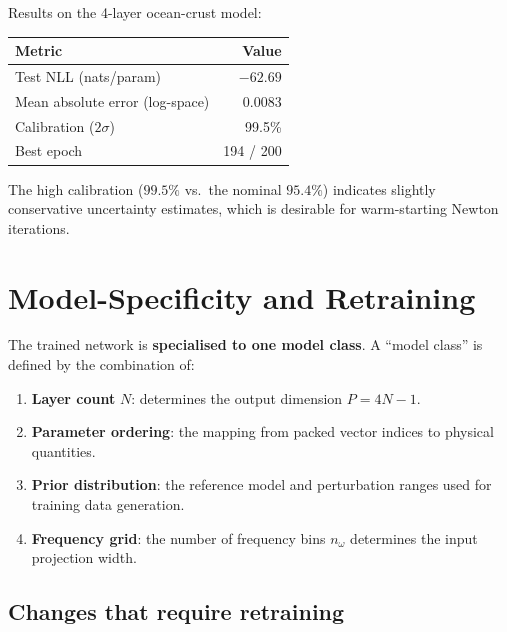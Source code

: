 \documentclass[11pt,a4paper]{article}
\theoremstyle{plain}
\theoremstyle{remark}
\begin{document}
\noindent Results on the 4-layer ocean-crust model:
\begin{center}
\renewcommand{\arraystretch}{1.3}
\begin{tabular}{lr}
  \toprule
  \textbf{Metric} & \textbf{Value} \\
  \midrule
  Test NLL (nats/param) & $-62.69$ \\
  Mean absolute error (log-space) & 0.0083 \\
  Calibration ($2\sigma$) & 99.5\% \\
  Best epoch & 194 / 200 \\
  \bottomrule
\end{tabular}
\end{center}

\noindent The high calibration ($99.5\%$ vs.\ the nominal $95.4\%$)
indicates slightly conservative uncertainty estimates, which is
desirable for warm-starting Newton iterations.

\section{Model-Specificity and Retraining}\label{sec:specificity}

The trained network is \textbf{specialised to one model class}.  A
``model class'' is defined by the combination of:
\begin{enumerate}[nosep]
  \item \textbf{Layer count} $N$: determines the output dimension
    $P = 4N - 1$.
  \item \textbf{Parameter ordering}: the mapping from packed vector
    indices to physical quantities.
  \item \textbf{Prior distribution}: the reference model and
    perturbation ranges used for training data generation.
  \item \textbf{Frequency grid}: the number of frequency bins $n_\omega$
    determines the input projection width.
\end{enumerate}

\subsection{Changes that require retraining}
\end{document}
